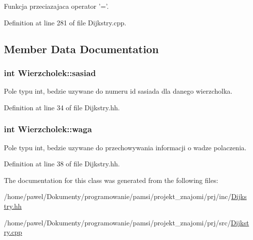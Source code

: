 Funkcja przeciazajaca operator '='. 



Definition at line 281 of file Dijkstry.\-cpp.



\subsection{Member Data Documentation}
\hypertarget{class_wierzcholek_a064e9d988e2bf41110c06f50ee4a7549}{
\subsubsection[{sasiad}]{\setlength{\rightskip}{0pt plus 5cm}int Wierzcholek\-::sasiad}}\label{class_wierzcholek_a064e9d988e2bf41110c06f50ee4a7549}


Pole typu int, bedzie uzywane do numeru id sasiada dla danego wierzcholka. 



Definition at line 34 of file Dijkstry.\-hh.

\hypertarget{class_wierzcholek_a75fca22ce5c86f0cbf29276f7f5204c3}{
\subsubsection[{waga}]{\setlength{\rightskip}{0pt plus 5cm}int Wierzcholek\-::waga}}\label{class_wierzcholek_a75fca22ce5c86f0cbf29276f7f5204c3}


Pole typu int, bedzie uzywane do przechowywania informacji o wadze polaczenia. 



Definition at line 38 of file Dijkstry.\-hh.



The documentation for this class was generated from the following files\-:\begin{DoxyCompactItemize}
\item 
/home/pawel/\-Dokumenty/programowanie/pamsi/projekt\-\_\-znajomi/prj/inc/\hyperlink{_dijkstry_8hh}{Dijkstry.\-hh}\item 
/home/pawel/\-Dokumenty/programowanie/pamsi/projekt\-\_\-znajomi/prj/src/\hyperlink{_dijkstry_8cpp}{Dijkstry.\-cpp}\end{DoxyCompactItemize}
